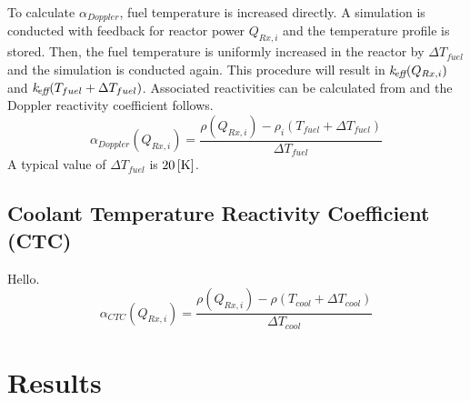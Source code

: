     To calculate $\alpha_{Doppler}$, fuel temperature is increased directly. A
    simulation is conducted with feedback for reactor power $Q_{Rx,i}$ and the
    temperature profile is stored. Then, the fuel temperature is uniformly 
    increased in the reactor by $\Delta T_{fuel}$ and the simulation is
    conducted again. This procedure will result in $k_{\!\mbox{\scriptsize \em eff}}(Q_{Rx,i})$ and
    ${k_{\!\mbox{\scriptsize \em eff}}(T_{fuel} + \Delta T_{fuel})}$. Associated reactivities can be
    calculated from  and the Doppler reactivity coefficient
    follows.
    \begin{equation}
      \label{eq:doppler_reactivity_coefficient}
      \alpha_{Doppler}(Q_{Rx,i}) = \frac{\rho(Q_{Rx,i}) - \rho_i(T_{fuel} +
        \Delta T_{fuel})} {\Delta T_{fuel}}
    \end{equation}
    A typical value of $\Delta T_{fuel}$ is $20\left[\text{{K}}\right]$.

  \subsection{Coolant Temperature Reactivity Coefficient (CTC)}
  \label{sec:coolant_temperature_reactivity_coefficient}
    Hello.
    \begin{equation}
      \label{eq:coolant_temperature_reactivity_coefficient}
      \alpha_{CTC}(Q_{Rx,i}) = \frac{\rho(Q_{Rx,i}) - \rho(T_{cool} + 
        \Delta T_{cool})} {\Delta T_{cool}}
    \end{equation}

\section{Results}
\label{sec:results}

  \begin{figure}
    \centering
    \hspace*{\fill}
    \vspace{\baselineskip}
    \hspace*{\fill}
  \end{figure}

